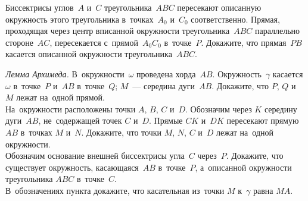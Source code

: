 \begin{problems}
\item
Биссектрисы углов~$A$ и~$C$ треугольника~$ABC$ пересекают описанную окружность
этого треугольника в~точках~$A_0$ и~$C_0$ соответственно.
Прямая, проходящая через центр вписанной окружности треугольника~$ABC$
параллельно стороне~$AC$, пересекается с~прямой~$A_0C_0$ в~точке~$P$.
Докажите, что прямая~$PB$ касается описанной окружности треугольника~$ABC$.

\item
\subproblem
{}%
\emph{Лемма Архимеда.}
В~окружности~$\omega$ проведена хорда~$AB$.
Окружность~$\gamma$ касается $\omega$ в~точке~$P$ и~$AB$ в~точке~$Q$;
$M$~--- середина дуги~$AB$.
Докажите, что $P$, $Q$ и~$M$ лежат на~одной прямой.
\\
\subproblem
На~окружности расположены точки $A$, $B$, $C$ и~$D$.
Обозначим через $K$ середину дуги~$AB$, не~содержащей точек $C$ и~$D$.
Прямые $CK$ и~$DK$ пересекают прямую $AB$ в~точках $M$ и~$N$.
Докажите, что точки $M$, $N$, $C$ и~$D$ лежат на~одной окружности.
\\
\subproblem
Обозначим основание внешней биссектрисы угла~$C$ через~$P$.
Докажите, что существует окружность, касающаяся~$AB$ в~точке~$P$, а~описанной
окружности треугольника $ABC$ в~точке~$C$.
\\
\subproblem
В~обозначениях пункта
докажите, что касательная из~точки $M$ к~$\gamma$
равна $MA$.
\end{problems}

